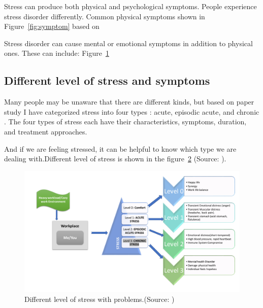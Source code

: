 Stress can produce both physical and psychological symptoms. People experience stress disorder differently. Common physical symptoms shown in Figure~\ref{fig:symptom} based on \citep{Legg2017StressManagement}

Stress disorder can cause mental or emotional symptoms in addition to physical ones. These can include: Figure~\ref{fig:mentalsymptom} 
\begin{figure}[ht!]
\centering
{}
  \label{fig:mentalsymptom}
\end{figure}

\subsection{Different level of stress and symptoms}
Many people may be unaware that there are different kinds, but based on \citep{Freshwater20183Hazards} paper study I have categorized stress into four types : acute, episodic acute, and chronic . The four types of stress each have their characteristics, symptoms, duration, and treatment approaches.

And if we are feeling stressed, it can be helpful to know which type we are dealing with.Different level of stress is shown in the figure~\ref{fig:levelOfStress} (Source: \cite{Freshwater20183Hazards}).\\
\begin{figure}[ht!] %
  \centering
  \includegraphics[width=1.10\linewidth]{chap1/images/problem_goal.pdf}
  \caption[Different level of stress ]{Different level of stress with problems.(Source: \cite{Freshwater20183Hazards})}
  \label{fig:levelOfStress}
\end{figure}

